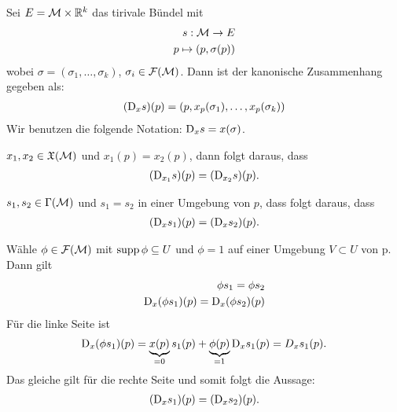 \begin{bsp}
Sei $E = \mathcal{M} \times \mathbb{R}^k$ das tirivale Bündel mit
\begin{align}
s: \mathcal{M} \to E \\
p \mapsto (p, \sigma(p))
\end{align}
wobei $\sigma = (\sigma_1, \dots, \sigma_k)$, $\sigma_i \in \mathcal{F}(\mathcal{M})$.
Dann ist der kanonische Zusammenhang gegeben als:
\begin{align}
(\mathrm{D}_x s)(p) = (p, x_p(\sigma_1), \dots, x_p(\sigma_k))
\end{align}
Wir benutzen die folgende Notation: $\mathrm{D}_x s = x(\sigma)$.
\end{bsp}

\begin{lem}
\label{lem:lokalisierung1}
$x_1, x_2 \in \mathfrak{X}(\mathcal{M})$ und $x_1(p) = x_2(p)$,
dann folgt daraus, dass 
\begin{align}
(\mathrm{D}_{x_1} s)(p) = (\mathrm{D}_{x_2} s) (p).
\end{align}

\end{lem}

\begin{lem}
\label{lem:lokalisierung2}
$s_1, s_2 \in \Gamma(\mathcal{M})$ und $s_1 = s_2$ in einer Umgebung von $p$,
dass folgt daraus, dass
\begin{align}
(\mathrm{D}_{x} s_1)(p) = (\mathrm{D}_{x} s_2) (p).
\end{align}
\end{lem}

\begin{bew}
Wähle $\phi \in \mathcal{F}(\mathcal{M})$ mit $\operatorname{supp} \phi \subseteq U$ und $\phi = 1$ auf einer Umgebung $V \subset U$ von p.
Dann gilt 
\begin{align}
\phi s_1 = \phi s_2 \\
\mathrm{D}_x(\phi s_1)(p) = \mathrm{D}_x(\phi s_2)(p)
\end{align}
Für die linke Seite ist
\begin{align}
\mathrm{D}_x(\phi s_1)(p) = \underbrace{x(p)}_{=0} s_1(p) + \underbrace{\phi(p)}_{=1} \mathrm{D}_x s_1(p) = D_x s_1 (p).
\end{align}
Das gleiche gilt für die rechte Seite und somit folgt die Aussage:
\begin{align}
(\mathrm{D}_{x} s_1)(p) = (\mathrm{D}_{x} s_2) (p).
\end{align}
\end{bew}

